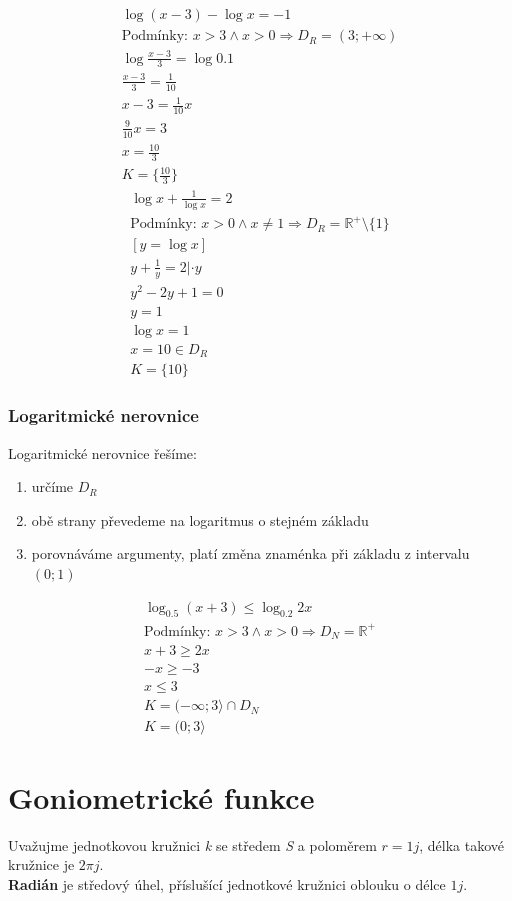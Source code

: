 \documentclass[12pt, a4paper]{article}
\newcommand{\imply}{\Rightarrow}
\begin{document}
\[\begin{aligned}
\log (x-3) - \log x = -1\\
\text{Podmínky: } x > 3 \land x > 0 \imply D_R = (3;+\infty)\\
\log \frac{x-3}{3} = \log 0.1\\
\frac{x-3}{3} = \frac{1}{10}\\
x-3 = \frac{1}{10}x\\
\frac{9}{10}x=3\\
x = \frac{10}{3}\\
K = \biggl\{\frac{10}{3} \biggr\}
\end{aligned}\]
\pagebreak
\[\begin{aligned}
\log x + \frac{1}{\log x} =2\\
\text{Podmínky: } x > 0 \land x \neq 1 \imply D_R = \mathbb{R}^+ \setminus \{1\}\\
[y=\log x]\\
y+\frac{1}{y}=2 | \cdot y\\
y^2 - 2y + 1 = 0\\
y = 1\\
\log x = 1\\
x = 10 \in D_R\\
K = \{10\}
\end{aligned}\]

\subsubsection*{Logaritmické nerovnice}
Logaritmické nerovnice řešíme:
\begin{enumerate}
\item určíme $D_R$
\item obě strany převedeme na logaritmus o stejném základu
\item porovnáváme argumenty, platí změna znaménka při základu z intervalu $(0;1)$
\end{enumerate}

\[\begin{aligned}
\log_{0.5} (x+3) \leq \log_{0.2} 2x\\
\text{Podmínky: }x > 3 \land x > 0 \imply D_N = \mathbb{R}^+\\ 
x+3 \geq 2x\\
-x \geq -3\\
x \leq 3\\
K = (-\infty;3 \rangle \cap D_N\\
K = (0;3 \rangle
\end{aligned}\]
\pagebreak
\section{Goniometrické funkce}
Uvažujme jednotkovou kružnici \textit{k} se středem \textit{S} a poloměrem $r=1 j$, délka takové kružnice je $2 \pi j$.\\
\textbf{Radián} je středový úhel, příslušící jednotkové kružnici oblouku o délce $1 j$.\\
\end{document}
